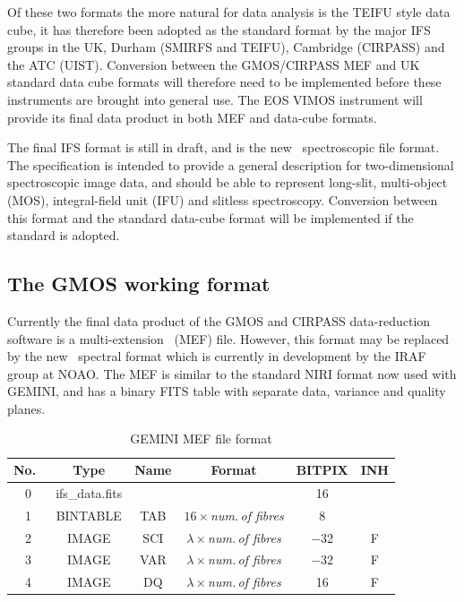 \documentclass[twoside,11pt]{article}
\newcommand{\htmlref}[2]{#1}
\newcommand{\xlabel}[1]{}
\begin{document}
\begin{\htmlonly}
Of these two formats the more natural for data analysis is the TEIFU
style data cube, it has therefore been adopted as the standard format
by the major IFS groups in the UK, Durham (SMIRFS and TEIFU),
Cambridge (CIRPASS) and the ATC (UIST).
\htmlref{Conversion}{sc16_mef2cub} between the GMOS/CIRPASS MEF and UK
standard data cube formats will therefore need to be implemented
before these instruments are brought into general use.  The EOS VIMOS
instrument will provide its final data product in both MEF and
data-cube formats.

The final IFS format is still in draft, and is the new \IRAF\ 
spectroscopic \htmlref{file format}{sc16_iraf}.  The specification is intended to
provide a general description for two-dimensional spectroscopic image
data, and should be able to represent long-slit, multi-object (MOS),
integral-field unit (IFU) and slitless spectroscopy.  Conversion
between this format and the standard data-cube format will be
implemented if the standard is adopted.

\subsection{\xlabel{sc16_gmosfile}The GMOS working format\label{sc16_gmosfile}}

Currently the final data product of the \htmlref{GMOS}{sc16_gmos} and
\htmlref{CIRPASS}{sc16_cirpass} data-reduction software is a
multi-extension \FITSref\ (MEF) file.  However, this format may be
replaced by the new \htmlref{\IRAF\ spectral
format}{sc16_iraf} which is
currently in development by the IRAF group at NOAO.  The MEF is
similar to the standard NIRI format now used with GEMINI, and has a
binary FITS table with separate data, variance and quality planes.

\begin{table}[h]
\begin{center}
\begin{tabular}{cccccc}
No.\ & Type  & Name & Format & BITPIX & INH\\\hline 
0  & ifs\_data.fits &  &                                     &  16 &   \\
1  & BINTABLE  & TAB & $16 \times${\em num.\,of fibres}      &   8 &   \\    
2  & IMAGE     & SCI & $\lambda \times${\em num.\,of fibres} & $-$32 & F \\
3  & IMAGE     & VAR & $\lambda \times${\em num.\,of fibres} & $-$32 & F \\
4  & IMAGE     & DQ  & $\lambda \times${\em num.\,of fibres} &  16 & F \\ \hline
\end{tabular}
\caption{GEMINI MEF file format}
\end{center}
\protect\label{tab:mef_file}
\end{table} 


\end{\htmlonly}
\end{document}

